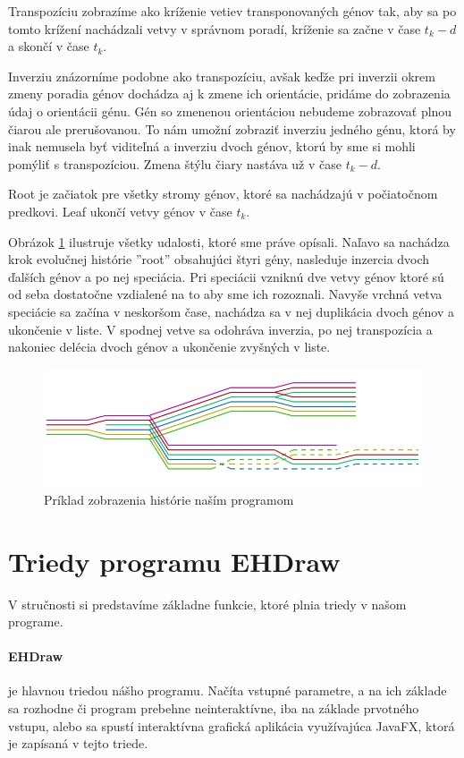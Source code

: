 Transpozíciu zobrazíme ako kríženie vetiev transponovaných génov tak, aby sa po tomto krížení nachádzali vetvy v správnom poradí,
kríženie sa začne v čase $t_k - d$ a skončí v čase $t_k$.

Inverziu znázorníme podobne ako transpozíciu, avšak keďže pri inverzii okrem zmeny poradia génov dochádza aj k zmene ich orientácie, pridáme do zobrazenia údaj o orientácii génu.
Gén so zmenenou orientáciou nebudeme zobrazovať plnou čiarou ale prerušovanou. To nám umožní zobraziť inverziu jedného génu,
ktorá by inak nemusela byť viditeľná a inverziu dvoch génov, ktorú by sme si mohli pomýliť s transpozíciou. 
Zmena štýlu čiary nastáva už v čase  $t_k - d$.

Root je začiatok pre všetky stromy génov, ktoré sa nachádzajú v počiatočnom predkovi.
Leaf ukončí vetvy génov v čase $t_k$.

 
Obrázok \ref{obr:events} ilustruje všetky udalosti, ktoré sme práve opísali.
Naľavo sa nachádza krok evolučnej histórie ''root'' obsahujúci štyri gény,
nasleduje inzercia dvoch ďalších génov a po nej speciácia.
Pri speciácii vzniknú dve vetvy génov ktoré sú od seba dostatočne vzdialené na to aby sme ich rozoznali.
Navyše vrchná vetva speciácie sa začína v neskoršom čase, nachádza sa v nej duplikácia dvoch génov a ukončenie v liste.
V spodnej vetve sa odohráva inverzia, po nej transpozícia a nakoniec delécia dvoch génov a ukončenie zvyšných v liste.

\begin{figure}
\centerline{\includegraphics[width=1\textwidth]{images/udalosti}}
\caption{Príklad zobrazenia histórie naším programom}\label{obr:events}
\end{figure}

\section{Triedy programu EHDraw}
V stručnosti si predstavíme základne funkcie, ktoré plnia triedy v našom programe.
\paragraph{EHDraw} je hlavnou triedou nášho programu.
Načíta vstupné parametre, a na ich základe sa rozhodne či program prebehne neinteraktívne, iba na základe prvotného vstupu, 
alebo sa spustí interaktívna grafická aplikácia využívajúca JavaFX, ktorá je zapísaná v tejto triede.
